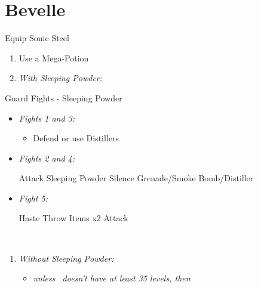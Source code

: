 \chapter{Bevelle}
\begin{equip}
\begin{itemize}

  \tidusf Equip Sonic Steel
  \end{itemize}
  \end{equip}
\begin{enumerate}
  \item Use a Mega-Potion
  \item \textit{With Sleeping Powder:}
\end{enumerate}
\begin{battle}{Guard Fights - Sleeping Powder}
  \begin{itemize}
    \item \textit{Fights 1 and 3:}
          \begin{itemize}
            \tidusf Attack
            \item Defend or use Distillers
          \end{itemize}
    \item \textit{Fights 2 and 4:}
          \begin{itemize}
            \tidusf Attack
            \rikkuf Sleeping Powder
            \kimahrif Silence Grenade/Smoke Bomb/Distiller
          \end{itemize}
    \item \textit{Fight 5:}
          \begin{itemize}
            \tidusf Haste \rikku
            \rikkuf Throw Items x2
            \tidusf Attack
          \end{itemize}
  \end{itemize}
\end{battle}
\vfill
\ 
\columnbreak
\begin{enumerate}[resume]
  \item \textit{Without Sleeping Powder:}
        \begin{itemize}
          \item \formation{\tidus}{\rikku}{\auron} \textit{unless \lulu\ doesn't have at least 35 levels, then } \formation{\tidus}{\rikku}{\lulu}
        \end{itemize}
\end{enumerate}

